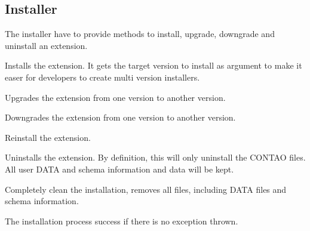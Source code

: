 \subsection[sec:installer]{Installer}

The installer have to provide methods to install, upgrade, downgrade and uninstall an extension.

 Installs the extension. It gets the target version to install as argument to make it easer for developers to create multi version installers.

\vspace{.5cm}
 Upgrades the extension from one version to another version.

\vspace{.5cm}
 Downgrades the extension from one version to another version.

\vspace{.5cm}
 Reinstall the extension.

\vspace{.5cm}
 Uninstalls the extension. By definition, this will only uninstall the CONTAO files. All user DATA and schema information and data will be kept.

\vspace{.5cm}
 Completely clean the installation, removes all files, including DATA files and schema information.

\vspace{.5cm}
The installation process success if there is no exception thrown.
